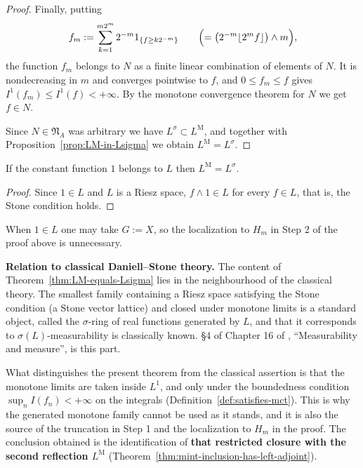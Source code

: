 \begin{proof}
  Finally, putting
  \[
    f_m:=\sum_{k=1}^{m2^m}2^{-m}1_{\{f\ge k2^{-m}\}}
    \qquad\Bigl(=\bigl(2^{-m}\lfloor2^mf\rfloor\bigr)\land m\Bigr) ,
  \]
  the function $f_m$ belongs to $N$ as a finite linear combination of elements of
  $N$.
  It is nondecreasing in $m$ and converges pointwise to $f$, and
  $0\le f_m\le f$ gives $I^1(f_m)\le I^1(f)<+\infty$.
  By the monotone convergence theorem for $N$ we get $f\in N$.

  Since $N\in\mathfrak{N}_A$ was arbitrary we have
  $L^{\sigma}\subset L^{\mathrm{M}}$, and together with
  Proposition~\ref{prop:LM-in-Lsigma} we obtain
  $L^{\mathrm{M}}=L^{\sigma}$.
\end{proof}

\begin{corollary}\label{cor:LM-equals-Lsigma-one}
  If the constant function $1$ belongs to $L$ then
  $L^{\mathrm{M}}=L^{\sigma}$.
\end{corollary}
\begin{proof}
  Since $1\in L$ and $L$ is a Riesz space, $f\land1\in L$ for every $f\in L$,
  that is, the Stone condition holds.
\end{proof}

\noindent
When $1\in L$ one may take $G:=X$, so the localization to $H_m$ in Step 2 of the
proof above is unnecessary.

\medskip
\noindent
\textbf{Relation to classical Daniell--Stone theory.}
The content of Theorem~\ref{thm:LM-equals-Lsigma} lies in the neighbourhood of
the classical theory.
The smallest family containing a Riesz space satisfying the Stone condition (a
Stone vector lattice) and closed under monotone limits is a standard object,
called the $\sigma$-ring of real functions generated by $L$, and that it
corresponds to $\sigma(L)$-measurability is classically known.
\S4 of Chapter 16 of \cite{Royden}, ``Measurability and measure'', is this part.

What distinguishes the present theorem from the classical assertion is that the
monotone limits are taken inside $L^1$, and only under the boundedness condition
$\sup_nI(f_n)<+\infty$ on the integrals
(Definition~\ref{def:satisfies-mct}).
This is why the generated monotone family cannot be used as it stands, and it is
also the source of the truncation in Step 1 and the localization to $H_m$ in the
proof.
The conclusion obtained is the identification of \textbf{that restricted closure
with the second reflection $L^{\mathrm{M}}$}
(Theorem~\ref{thm:mint-inclusion-has-left-adjoint}).

